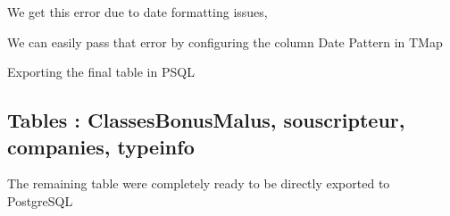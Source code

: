 We get this error due to date formatting issues,
\begin{figure}[H]
\centering
{}
\end{figure}

We can easily pass that error by configuring the column Date Pattern in TMap
\begin{figure}[H]
\centering
{}
\end{figure}

Exporting the final table in PSQL
\begin{figure}[H]
\centering
{}
\end{figure}

\subsection{Tables : ClassesBonusMalus, souscripteur, companies, typeinfo}

The remaining table were completely ready to be directly exported to PostgreSQL 

\begin{figure}[H]
\centering
{}
\end{figure}



